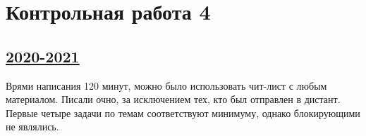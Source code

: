 
\newpage
\thispagestyle{empty}
\section{Контрольная работа 4}


\subsection[2020-2021]{\hyperref[sec:sol_kr_04_2020_2021]{2020-2021}}
\label{sec:kr_04_2020_2021}

Врями написания 120 минут, можно было использовать 
чит-лист с любым материалом. Писали очно, 
за исключением тех, кто был отправлен в дистант. 
Первые четыре задачи по темам соответствуют минимуму, однако блокирующими не являлись. 


